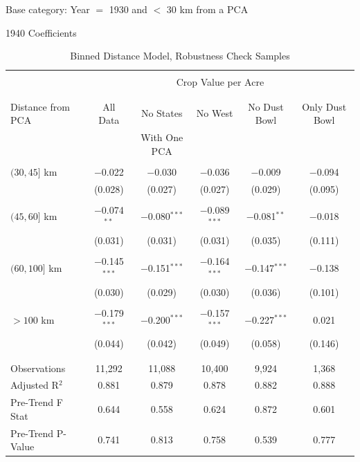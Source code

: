 \documentclass[12pt]{article}
\begin{document}
\begin{table}
    \centering

    \caption{Binned Distance Model, Robustness Check Samples}
\footnotesize   
\vspace{.5cm} 
Base category: Year $=$ 1930 and $<$ 30 km from a PCA

1940 Coefficients
\label{crop_val_sample}
\begin{threeparttable}[t]

\begin{tabular}{@{\extracolsep{5pt}}lccccc} 
    \\[-1.8ex]\hline 
    \hline \\[-1.8ex] 
    & \multicolumn{5}{c}{Crop Value per Acre} \\ 
    \cline{2-5} 
    \\[-1.8ex] & \multicolumn{5}{c}{} \\ 
    Distance from PCA & All Data & No States & No West & No Dust Bowl & Only Dust Bowl \\
             &           & With One PCA & & & \\ 
    \hline \\[-1.8ex] 
    $(30, 45]$ km & $-$0.022 & $-$0.030 & $-$0.036 & $-$0.009 & $-$0.094 \\ 
    & (0.028) & (0.027) & (0.027) & (0.029) & (0.095) \\ 
    & & & & & \\ 
    $(45, 60]$ km & $-$0.074$^{**}$ & $-$0.080$^{***}$ & $-$0.089$^{***}$ & $-$0.081$^{**}$ & $-$0.018 \\ 
    & (0.031) & (0.031) & (0.031) & (0.035) & (0.111) \\ 
    & & & & & \\ 
    $(60, 100]$ km & $-$0.145$^{***}$ & $-$0.151$^{***}$ & $-$0.164$^{***}$ & $-$0.147$^{***}$ & $-$0.138 \\ 
    & (0.030) & (0.029) & (0.030) & (0.036) & (0.101) \\ 
    & & & & & \\ 
    $> 100$ km & $-$0.179$^{***}$ & $-$0.200$^{***}$ & $-$0.157$^{***}$ & $-$0.227$^{***}$ & 0.021 \\ 
    & (0.044) & (0.042) & (0.049) & (0.058) & (0.146) \\ 
    & & & & & \\ 
    \hline \\[-1.8ex] 
    Observations & 11,292 & 11,088 & 10,400 & 9,924 & 1,368 \\ 
    Adjusted R$^{2}$ & 0.881 & 0.879 & 0.878 & 0.882 & 0.888 \\
    Pre-Trend F Stat & 0.644 & 0.558 & 0.624 & 0.872 & 0.601 \\ 
    Pre-Trend P-Value & 0.741 & 0.813 & 0.758 & 0.539 & 0.777 \\ 


\end{tabular}
\end{threeparttable}
\end{table}
\end{document}
